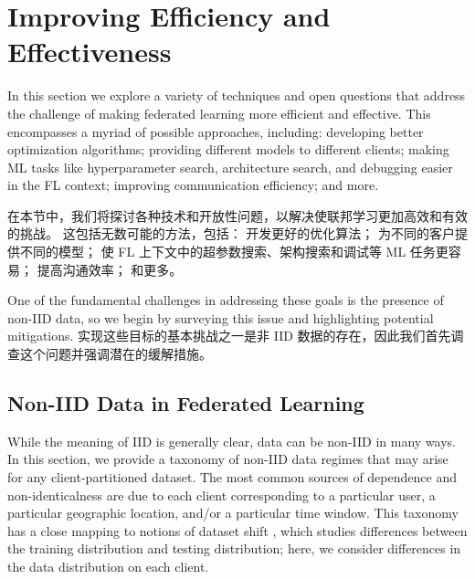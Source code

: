 \section{Improving Efficiency and Effectiveness}
\label{sec:better_fl}

In this section we explore a variety of techniques and open questions that address the challenge of making federated learning more efficient and effective. This encompasses a myriad of possible approaches, including: developing better optimization algorithms; providing different models to different clients; making ML tasks like hyperparameter search, architecture search, and debugging easier in the FL context; improving communication efficiency; and more. 

在本节中，我们将探讨各种技术和开放性问题，以解决使联邦学习更加高效和有效的挑战。 这包括无数可能的方法，包括： 开发更好的优化算法； 为不同的客户提供不同的模型； 使 FL 上下文中的超参数搜索、架构搜索和调试等 ML 任务更容易； 提高沟通效率； 和更多。

One of the fundamental challenges in addressing these goals is the presence of non-IID data, so we begin by surveying this issue and highlighting potential mitigations.
实现这些目标的基本挑战之一是非 IID 数据的存在，因此我们首先调查这个问题并强调潜在的缓解措施。

\newcommand{\Ploc}{\mathcal{P}}
\newcommand{\Pcli}{\mathcal{Q}}

\subsection{Non-IID Data in Federated Learning}\label{sec:noniid}
While the meaning of IID is generally clear, data can be non-IID in many ways. In this section, we provide a taxonomy of non-IID data regimes that may arise for any client-partitioned dataset. The most common sources of dependence and non-identicalness are due to each client corresponding to a particular user, a particular geographic location, and/or a particular time window. This taxonomy has a close mapping to notions of dataset shift \citep{torres2012unifying,candela2009datasetshift}, which studies differences between the training distribution and testing distribution; here, we consider differences in the data distribution on each client. 


